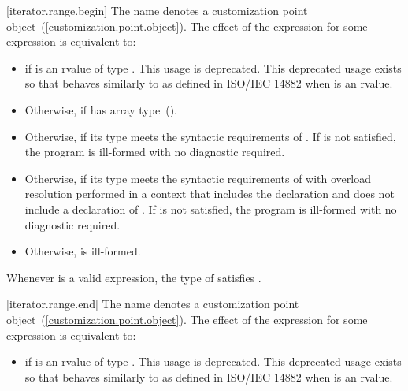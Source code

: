 {\color{newclr}
[iterator.range.begin]{}
\pnum
The name  denotes a customization point
 object~(\ref{customization.point.object}). The effect of the expression
 for some expression  is equivalent to:

\begin{itemize}
\item
   if  is an rvalue of
  type . This usage is deprecated.
  \enternote This deprecated usage exists so that
   behaves similarly to 
  as defined in ISO/IEC 14882 when  is an rvalue. \exitnote

\item
  Otherwise,  if  has array
  type~().

\item
  Otherwise,  if its type  meets the
  syntactic requirements of . If
   is not satisfied, the program is ill-formed
  with no diagnostic required.

\item
  Otherwise,  if its type  meets the
  syntactic requirements of  with overload
  resolution performed in a context that includes the declaration
   and does not include
  a declaration of . If 
  is not satisfied, the program is ill-formed with no diagnostic
  required.

\item
  Otherwise,  is ill-formed.
\end{itemize}

\pnum
\remark Whenever  is a valid expression, the
type of  satisfies .

[iterator.range.end]{}
\pnum
The name  denotes a customization point
object~(\ref{customization.point.object}). The effect of the expression
 for some expression  is equivalent to:

\begin{itemize}
\item
   if  is an rvalue of
  type . This usage is deprecated.
  \enternote This deprecated usage exists so that
   behaves similarly to 
  as defined in ISO/IEC 14882 when  is an rvalue. \exitnote


\end{itemize}}
